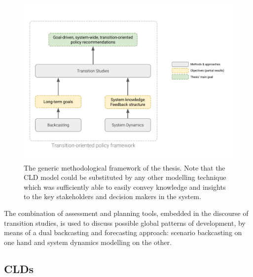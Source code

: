 \begin{figure}[h]
\centering
\includegraphics[trim=1cm 2cm 1.5cm 3cm,clip,width=\linewidth]{figures/methods-goals.pdf}
\caption[Thesis' methodological framework]{The generic methodological framework of the thesis. Note that the CLD model could be substituted by any other modelling technique which was sufficiently able to easily convey knowledge and insights to the key stakeholders and decision makers in the system.}
\label{fig:thesis-aim-methods}
\end{figure}

The combination of assessment and planning tools, embedded in the discourse of transition studies, is used to discuss possible global patterns of development, by means of a dual backcasting and forecasting approach: scenario backcasting on one hand and system dynamics modelling on the other.

\subsection{CLDs}
\label{ss:methods:causal-loop-diagram-development}

